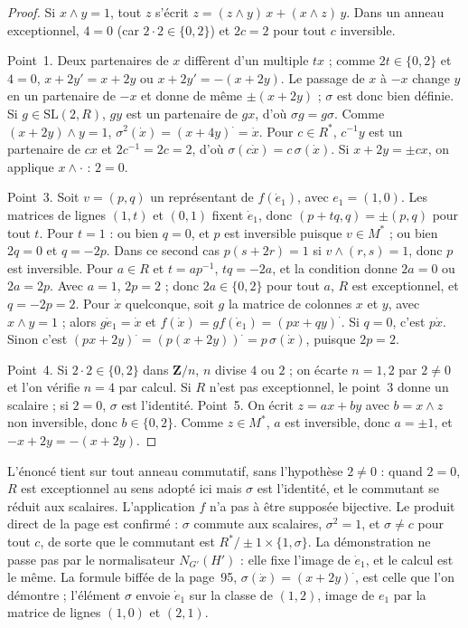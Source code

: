 \begin{proof}
Si $x \wedge y = 1$, tout $z$ s'écrit $z = (z \wedge y)\,x + (x \wedge z)\,y$. Dans un anneau exceptionnel, $4 = 0$ (car $2 \cdot 2 \in \{0, 2\}$) et $2c = 2$ pour tout $c$ inversible.

Point~1. Deux partenaires de $x$ diffèrent d'un multiple $tx$ ; comme $2t \in \{0, 2\}$ et $4 = 0$, $x + 2y' = x + 2y$ ou $x + 2y' = -(x + 2y)$. Le passage de $x$ à $-x$ change $y$ en un partenaire de $-x$ et donne de même $\pm(x + 2y)$ ; $\sigma$ est donc bien définie. Si $g \in \mathrm{SL}(2, R)$, $gy$ est un partenaire de $gx$, d'où $\sigma g = g\sigma$. Comme $(x + 2y) \wedge y = 1$, $\sigma^2(\dot x) = (x + 4y)^{\cdot} = \dot x$. Pour $c \in R^*$, $c^{-1}y$ est un partenaire de $cx$ et $2c^{-1} = 2c = 2$, d'où $\sigma(c\dot x) = c\,\sigma(\dot x)$. Si $x + 2y = \pm cx$, on applique $x \wedge \cdot$ : $2 = 0$.

Point~3. Soit $v = (p, q)$ un représentant de $f(\dot e_1)$, avec $e_1 = (1, 0)$. Les matrices de lignes $(1, t)$ et $(0, 1)$ fixent $\dot e_1$, donc $(p + tq, q) = \pm(p, q)$ pour tout $t$. Pour $t = 1$ : ou bien $q = 0$, et $p$ est inversible puisque $v \in M^*$ ; ou bien $2q = 0$ et $q = -2p$. Dans ce second cas $p(s + 2r) = 1$ si $v \wedge (r, s) = 1$, donc $p$ est inversible. Pour $a \in R$ et $t = ap^{-1}$, $tq = -2a$, et la condition donne $2a = 0$ ou $2a = 2p$. Avec $a = 1$, $2p = 2$ ; donc $2a \in \{0, 2\}$ pour tout $a$, $R$ est exceptionnel, et $q = -2p = 2$. Pour $\dot x$ quelconque, soit $g$ la matrice de colonnes $x$ et $y$, avec $x \wedge y = 1$ ; alors $g\dot e_1 = \dot x$ et $f(\dot x) = g f(\dot e_1) = (px + qy)^{\cdot}$. Si $q = 0$, c'est $p\dot x$. Sinon c'est $(px + 2y)^{\cdot} = (p(x + 2y))^{\cdot} = p\,\sigma(\dot x)$, puisque $2p = 2$.

Point~4. Si $2\cdot 2 \in \{0, 2\}$ dans $\mathbf Z/n$, $n$ divise $4$ ou $2$ ; on écarte $n = 1, 2$ par $2 \neq 0$ et l'on vérifie $n = 4$ par calcul. Si $R$ n'est pas exceptionnel, le point~3 donne un scalaire ; si $2 = 0$, $\sigma$ est l'identité. Point~5. On écrit $z = ax + by$ avec $b = x \wedge z$ non inversible, donc $b \in \{0, 2\}$. Comme $z \in M^*$, $a$ est inversible, donc $a = \pm 1$, et $-x + 2y = -(x + 2y)$.
\end{proof}

\begin{remarque}
L'énoncé tient sur tout anneau commutatif, sans l'hypothèse $2 \neq 0$ : quand $2 = 0$, $R$ est exceptionnel au sens adopté ici mais $\sigma$ est l'identité, et le commutant se réduit aux scalaires. L'application $f$ n'a pas à être supposée bijective. Le produit direct de la page est confirmé : $\sigma$ commute aux scalaires, $\sigma^2 = 1$, et $\sigma \neq c$ pour tout $c$, de sorte que le commutant est $R^*/\pm 1 \times \{1, \sigma\}$. La démonstration ne passe pas par le normalisateur $N_{G'}(H')$ : elle fixe l'image de $\dot e_1$, et le calcul est le même. La formule biffée de la page~95, $\sigma(\dot x) = (x + 2y)^{\cdot}$, est celle que l'on démontre ; l'élément $\sigma$ envoie $\dot e_1$ sur la classe de $(1, 2)$, image de $e_1$ par la matrice de lignes $(1, 0)$ et $(2, 1)$.
\end{remarque}

